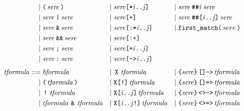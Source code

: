 \documentclass[a4paper,twoside,10pt,DIV=12]{scrreprt}
\DeclareMathOperator{\X}{\texttt{X}}
\newcommand{\StrongX}{\texttt{X[!]}}
\newcommand{\XREP}[1]{\texttt{X[#1]}}
\newcommand{\StrongXREP}[1]{\texttt{X[#1!]}}
\DeclareMathOperator{\NOT}{\texttt{!}}
\newcommand{\OR}{\mathbin{\texttt{|}}}
\newcommand{\AND}{\mathbin{\texttt{\&}}}
\newcommand{\ANDALT}{\mathbin{\texttt{\&\&}}}
\newcommand{\FUSION}{\mathbin{\texttt{:}}}
\newcommand{\CONCAT}{\mathbin{\texttt{;}}}
\newcommand{\DELAY}[1]{\mathbin{\texttt{\#\##1}}}
\newcommand{\DELAYR}[1]{\mathbin{\texttt{\#\#[#1]}}}
\newcommand{\0}{\texttt{0}}
\newcommand{\1}{\texttt{1}}
\newcommand{\STAR}[1]{\texttt{[*#1]}}
\newcommand{\FSTAR}[1]{\texttt{[:*#1]}}
\newcommand{\EQUAL}[1]{\texttt{[=#1]}}
\newcommand{\GOTO}[1]{\texttt{[->#1]}}
\newcommand{\PLUS}{\texttt{[+]}}
\newcommand{\FPLUS}{\texttt{[:+]}}
\newcommand{\FIRSTMATCH}{\texttt{first\_match}}
\newcommand{\Esuffix}{\texttt{<>->}}
\newcommand{\Asuffix}{\texttt{[]->}}
\newcommand{\EsuffixEQ}{\texttt{<>=>}}
\newcommand{\AsuffixEQ}{\texttt{[]=>}}
\newcommand\mvar[1]{\ensuremath{\mathit{#1}}}
\newcommand\code[1]{\texttt{#1}}
\newcommand\tsamp[1]{\text{\texttt{#1}}}
\newcommand\msamp[1]{#1}
\begin{document}
\begin{align*}
  \mid{}                    & \tsamp{(}\,\mathit{sere}\,\tsamp{)}                    & \mid{} & \mathit{sere}\msamp{\STAR{\mvar{i}..\mvar{j}}}             & \mid{} & \mathit{sere}\DELAY{\mvar{i}}\mathit{sere}                               \\
  \mid{}                    & \mathit{sere}\msamp{\OR}\mathit{sere}                  & \mid{} & \mathit{sere}\msamp{\PLUS}                                 & \mid{} & \mathit{sere}\DELAYR{\mvar{i}..\mvar{j}}\mathit{sere}                    \\
  \mid{}                    & \mathit{sere}\msamp{\AND}\mathit{sere}                 & \mid{} & \mathit{sere}\msamp{\FSTAR{\mvar{i}..\mvar{j}}}            & \mid{} & \FIRSTMATCH\code(\,sere\,\code)                                          \\
  \mid{}                    & \mathit{sere}\msamp{\ANDALT}\mathit{sere}              & \mid{} & \mathit{sere}\msamp{\FPLUS}                                                                                                                    \\
  \mid{}                    & \mathit{sere}\msamp{\CONCAT}\mathit{sere}              & \mid{} & \mathit{sere}\msamp{\EQUAL{\mvar{i}..\mvar{j}}}                                                                                                \\
  \mid{}                    & \mathit{sere}\msamp{\FUSION}\mathit{sere}              & \mid{} & \mathit{sere}\msamp{\GOTO{\mvar{i}..\mvar{j}}}                                                                                                 \\[1ex]
 \mathit{tformula} ::={}    & \mathit{bformula}                                      & \mid{} & \msamp{\X}\,\mathit{tformula}                              & \mid{} & \tsamp{\{}\mathit{sere}\tsamp{\}}\,\msamp{\Asuffix}\,\mathit{tformula}   \\
 \mid{}                     & \tsamp{(}\,\mathit{tformula}\,\tsamp{)}                & \mid{} & \msamp{\StrongX}\,\mathit{tformula}                        & \mid{} & \tsamp{\{}\mathit{sere}\tsamp{\}}\,\msamp{\AsuffixEQ}\,\mathit{tformula} \\
 \mid{}                     & \msamp{\NOT}\,\mathit{tformula}\,                      & \mid{} & \msamp{\XREP{\mvar{i}..\mvar{j}}}\,\mathit{tformula}       & \mid{} & \tsamp{\{}\mathit{sere}\tsamp{\}}\,\msamp{\Esuffix}\,\mathit{tformula}   \\
 \mid{}                     & \mathit{tformula}\,\msamp{\AND}\,\mathit{tformula}     & \mid{} & \msamp{\StrongXREP{\mvar{i}..\mvar{j}}}\,\mathit{tformula} & \mid{} & \tsamp{\{}\mathit{sere}\tsamp{\}}\,\msamp{\EsuffixEQ}\,\mathit{tformula} \\

\end{align*}
\end{document}
